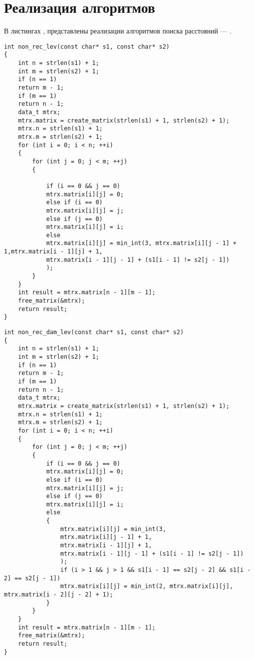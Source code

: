 \section{Реализация алгоритмов}
В листингах , представлены реализации алгоритмов поиска расстояний --- . 
\begin{center}
\begin{lstlisting}[label=lnr, caption={Матричный алгоритм поиска пути Левенштейна}]
int non_rec_lev(const char* s1, const char* s2)
{
	int n = strlen(s1) + 1;
	int m = strlen(s2) + 1;
	if (n == 1)
	return m - 1;
	if (m == 1)
	return n - 1;	
	data_t mtrx;
	mtrx.matrix = create_matrix(strlen(s1) + 1, strlen(s2) + 1);
	mtrx.n = strlen(s1) + 1;
	mtrx.m = strlen(s2) + 1;
	for (int i = 0; i < n; ++i)
	{	
		for (int j = 0; j < m; ++j)
		{
			
			if (i == 0 && j == 0)
			mtrx.matrix[i][j] = 0;
			else if (i == 0)
			mtrx.matrix[i][j] = j;
			else if (j == 0)
			mtrx.matrix[i][j] = i;
			else
			mtrx.matrix[i][j] = min_int(3, mtrx.matrix[i][j - 1] + 1,mtrx.matrix[i - 1][j] + 1,
			mtrx.matrix[i - 1][j - 1] + (s1[i - 1] != s2[j - 1])
			);
		}
	}
	int result = mtrx.matrix[n - 1][m - 1];
	free_matrix(&mtrx);
	return result;
}
\end{lstlisting}
\end{center}
\begin{center}
\begin{lstlisting}[label=dlnr, caption={Матричный алгоритм поиска пути  Дамерау-Левенштейна}]
int non_rec_dam_lev(const char* s1, const char* s2)
{
	int n = strlen(s1) + 1;
	int m = strlen(s2) + 1;
	if (n == 1)
	return m - 1;
	if (m == 1)
	return n - 1;
	data_t mtrx;
	mtrx.matrix = create_matrix(strlen(s1) + 1, strlen(s2) + 1);
	mtrx.n = strlen(s1) + 1;
	mtrx.m = strlen(s2) + 1;
	for (int i = 0; i < n; ++i)
	{
		for (int j = 0; j < m; ++j)
		{
			if (i == 0 && j == 0)
			mtrx.matrix[i][j] = 0;
			else if (i == 0)
			mtrx.matrix[i][j] = j;
			else if (j == 0)
			mtrx.matrix[i][j] = i;
			else
			{
				mtrx.matrix[i][j] = min_int(3,
				mtrx.matrix[i][j - 1] + 1,
				mtrx.matrix[i - 1][j] + 1,
				mtrx.matrix[i - 1][j - 1] + (s1[i - 1] != s2[j - 1])
				);
				if (i > 1 && j > 1 && s1[i - 1] == s2[j - 2] && s1[i - 2] == s2[j - 1])
				mtrx.matrix[i][j] = min_int(2, mtrx.matrix[i][j], mtrx.matrix[i - 2][j - 2] + 1);
			}
		}
	}
	int result = mtrx.matrix[n - 1][m - 1];
	free_matrix(&mtrx);
	return result;
}
\end{lstlisting}
\end{center}
